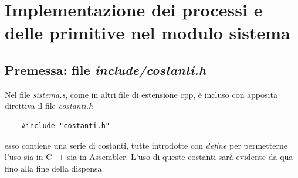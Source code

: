 \documentclass[11pt]{report}
\theoremstyle{definition}
\begin{document}
\chapter{Implementazione dei processi e delle primitive nel modulo sistema}

\section{Premessa: file \emph{include/costanti.h}}
Nel file \emph{sistema.s}, come in altri file di estensione cpp, è incluso con apposita direttiva il file \emph{costanti.h}
\begin{verbatim}
	#include "costanti.h"
\end{verbatim}
esso contiene una serie di costanti, tutte introdotte con \emph{define} per permetterne l'uso sia in C++ sia in Assembler. L'uso di queste costanti sarà evidente da qua fino alla fine della dispensa.
\end{document}
